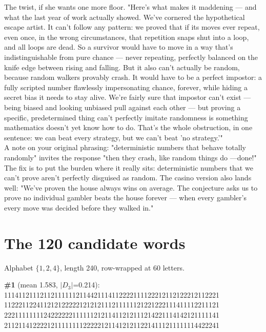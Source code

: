 \documentclass[10pt]{article}
\begin{document}
The twist, if she wants one more floor. "Here's what makes it maddening — and what the last year of work actually showed. We've cornered the
hypothetical escape artist. It can't follow any pattern: we proved that if its moves ever repeat, even once, in the wrong circumstances, that
repetition snaps shut into a loop, and all loops are dead. So a survivor would have to move in a way that's indistinguishable from pure chance —
never repeating, perfectly balanced on the knife edge between rising and falling. But it also can't actually be random, because random walkers
provably crash. It would have to be a perfect impostor: a fully scripted number flawlessly impersonating chance, forever, while hiding a secret bias
it needs to stay alive. We're fairly sure that impostor can't exist — being biased and looking unbiased pull against each other — but proving a
specific, predetermined thing can't perfectly imitate randomness is something mathematics doesn't yet know how to do. That's the whole obstruction,
in one sentence: we can beat every strategy, but we can't beat 'no strategy.'"\\

A note on your original phrasing: "deterministic numbers that behave totally randomly" invites the response "then they crash, like random things do —done!" The fix is to put the burden where it really sits: deterministic numbers that we can't prove aren't perfectly disguised as random. The casino version also lands well: "We've proven the house always wins on average. The conjecture asks us to prove no individual gambler beats the house forever — when every gambler's every move was decided before they walked in."\\

\appendix
\section{The 120 candidate words}
Alphabet $\{1,2,4\}$, length 240, row-wrapped at 60 letters.
\begingroup\ttfamily\scriptsize

\noindent\textbf{\#1} (mean 1.583, $|D_3|$=0.214):\\
111411211121121111112114421114112222111122212112122212112221\\
112221122411212122222121212111211111121221222111411112211121\\
222111111112422222211111121211411212111214221114142121111141\\
211211412222121111111122222121141212112214111211111114422241\medskip
\end{document}
